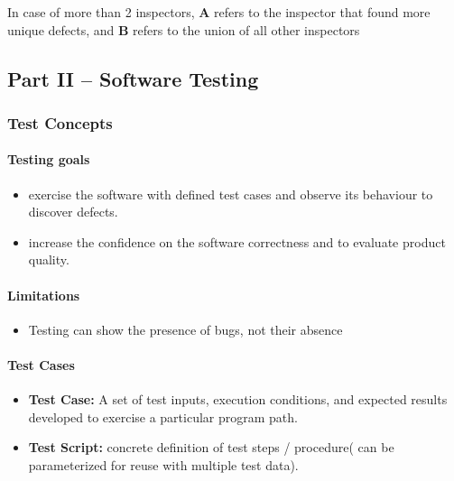 \documentclass[../ESOF_notes.tex]{subfiles}
\begin{document}
In case of more than 2 inspectors, \textbf{A} refers to the inspector that found
more unique defects, and \textbf{B} refers to the union of all other inspectors


\subsection{Part II – Software Testing}
\subsubsection{Test Concepts}
\paragraph{Testing goals}

\begin{itemize}
    \item exercise the software with defined test cases
          and observe its behaviour to discover defects.
    \item  increase the confidence on the software
          correctness and to evaluate product quality.
\end{itemize}

\paragraph{Limitations}
\begin{itemize}
    \item Testing can show the presence of bugs, not their absence
\end{itemize}
\paragraph{Test Cases}
\begin{itemize}
    \item \textbf{Test Case:} A set of test inputs,
          execution conditions, and expected results developed
          to exercise a particular program path.
    \item \textbf{Test Script:} concrete definition of test
          steps / procedure( can be parameterized for reuse with 
          multiple test data).
\end{itemize}
\end{document}
